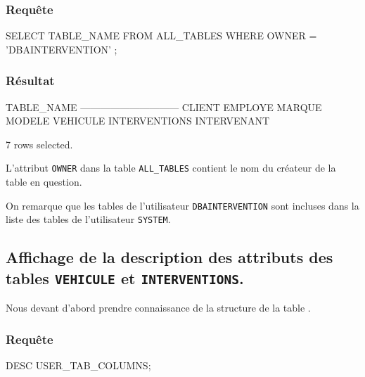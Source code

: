 \documentclass[•]{article}
\begin{document}
\subsubsection{Requête}
\begin{sql}
SELECT TABLE_NAME  
FROM ALL_TABLES 
WHERE OWNER = 'DBAINTERVENTION' ;
\end{sql}

\subsubsection{Résultat}
\begin{sql}
TABLE_NAME
------------------------------
CLIENT
EMPLOYE
MARQUE
MODELE
VEHICULE
INTERVENTIONS
INTERVENANT

7 rows selected.
\end{sql}


L'attribut \texttt{OWNER} dans la table \texttt{ALL\_TABLES} contient le nom du créateur de la table en question.

On remarque que les tables de l'utilisateur \texttt{DBAINTERVENTION} sont incluses dans la liste des tables de l'utilisateur \texttt{SYSTEM}.

\subsection{Affichage de la description des attributs des tables \texttt{VEHICULE} et \texttt{INTERVENTIONS}.}
Nous devant d'abord prendre connaissance de la structure de la table \texttt{}.
\subsubsection{Requête}
\begin{sql}
DESC USER_TAB_COLUMNS;
\end{sql}
\end{document}

